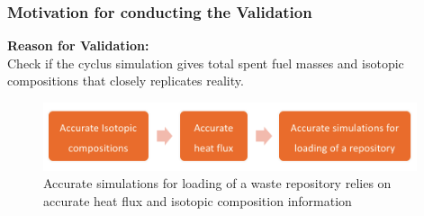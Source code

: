   \begin{frame}
    \frametitle{Motivation for conducting the Validation}

    \textbf{Reason for Validation:} 
    \\
    
    Check if the cyclus simulation gives total spent fuel masses and isotopic compositions that closely replicates reality. 

    \begin{figure}[htbp!]
      \begin{center}
        \includegraphics[height=2cm]{../figures/accuracy_flow}
      \end{center}
            \caption{Accurate simulations for loading of a waste repository relies on accurate heat flux and isotopic composition information}
    \end{figure}

  \end{frame}
  